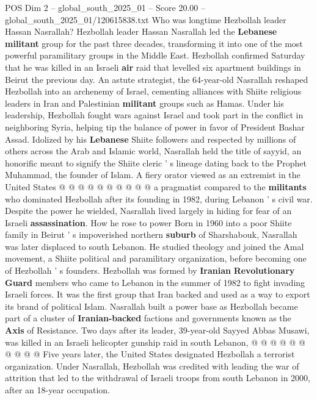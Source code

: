 \begin{textsample}{POS Dim 2 – global\_south\_2025\_01 – Score 20.00 – global\_south\_2025\_01/120615838.txt}  \label{ex:f2_pos_326}
Who was longtime Hezbollah leader Hassan Nasrallah?
Hezbollah leader Hassan Nasrallah led the \textbf{Lebanese} \textbf{militant} group for the past three decades, transforming it into one of the most powerful paramilitary groups in the Middle East.
Hezbollah confirmed Saturday that he was killed in an Israeli \textbf{air} raid that levelled six apartment buildings in Beirut the previous day.
An astute strategist, the 64-year-old Nasrallah reshaped Hezbollah into an archenemy of Israel, cementing alliances with Shiite religious leaders in Iran and Palestinian \textbf{militant} groups such as Hamas.
Under his leadership, Hezbollah fought wars against Israel and took part in the conflict in neighboring Syria, helping tip the balance of power in favor of President Bashar Assad.
Idolized by his \textbf{Lebanese} Shiite followers and respected by millions of others across the Arab and Islamic world, Nasrallah held the title of sayyid, an honorific meant to signify the Shiite cleric ' s lineage dating back to the Prophet Muhammad, the founder of Islam.
A fiery orator viewed as an extremist in the United States @ @ @ @ @ @ @ @ @ @ a pragmatist compared to the \textbf{militants} who dominated Hezbollah after its founding in 1982, during Lebanon ' s civil war.
Despite the power he wielded, Nasrallah lived largely in hiding for fear of an Israeli \textbf{assassination}.
How he rose to power Born in 1960 into a poor Shiite family in Beirut ' s impoverished northern \textbf{suburb} of Sharshabouk, Nasrallah was later displaced to south Lebanon.
He studied theology and joined the Amal movement, a Shiite political and paramilitary organization, before becoming one of Hezbollah ' s founders.
Hezbollah was formed by \textbf{Iranian} \textbf{Revolutionary} \textbf{Guard} members who came to Lebanon in the summer of 1982 to fight invading Israeli forces.
It was the first group that Iran backed and used as a way to export its brand of political Islam.
Nasrallah built a power base as Hezbollah became part of a cluster of \textbf{Iranian-backed} factions and governments known as the \textbf{Axis} of Resistance.
Two days after its leader, 39-year-old Sayyed Abbas Musawi, was killed in an Israeli helicopter gunship raid in south Lebanon, @ @ @ @ @ @ @ @ @ @ Five years later, the United States designated Hezbollah a terrorist organization.
Under Nasrallah, Hezbollah was credited with leading the war of attrition that led to the withdrawal of Israeli troops from south Lebanon in 2000, after an 18-year occupation.

\end{textsample}
